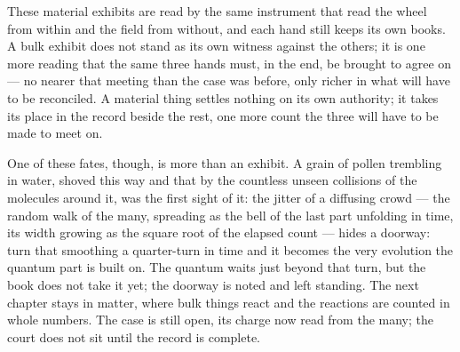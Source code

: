 These material exhibits are read by the same instrument that read the wheel from within and the field from
without, and each hand still keeps its own books. A bulk exhibit does not stand as its own witness against the
others; it is one more reading that the same three hands must, in the end, be brought to agree on --- no nearer
that meeting than the case was before, only richer in what will have to be reconciled. A material thing settles
nothing on its own authority; it takes its place in the record beside the rest, one more count the three will
have to be made to meet on.

One of these fates, though, is more than an exhibit. A grain of pollen trembling in water, shoved this way and
that by the countless unseen collisions of the molecules around it, was the first sight of it: the jitter of a
diffusing crowd --- the random walk of the many, spreading as the bell of the last part unfolding in time, its
width growing as the square root of the elapsed count --- hides a doorway: turn that smoothing a quarter-turn in time and it becomes the very evolution
the quantum part is built on. The quantum waits just beyond that turn, but the book does not take
it yet; the doorway is noted and left standing. The next chapter stays in matter, where bulk things react and
the reactions are counted in whole numbers. The case is still open, its charge now read from the many; the court
does not sit until the record is complete.

